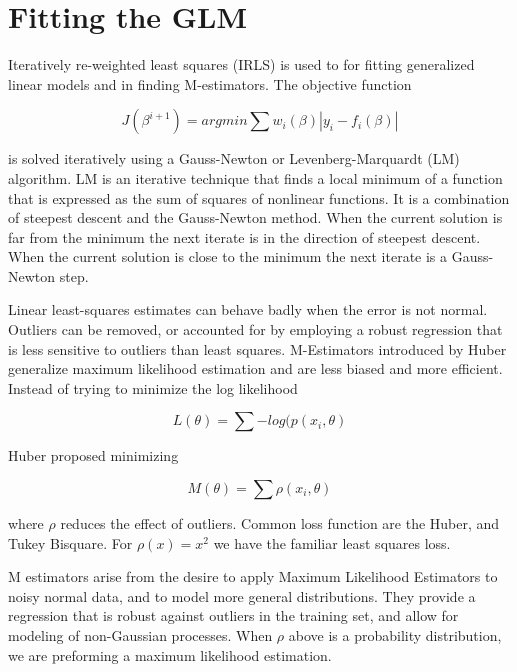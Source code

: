 \section*{Fitting the GLM}Iteratively re-weighted least squares (IRLS) is used to for fitting generalized linear models and in finding M-estimators.  The objective function

\begin{equation}
J(\beta^{i+1}) = arg min \sum w_i ( \beta) | y_i - f_i (\beta) |
\end{equation}

is solved iteratively using a Gauss-Newton or Levenberg-Marquardt (LM) algorithm. LM is an iterative technique that finds a local minimum of a function that is expressed as the sum of squares of nonlinear functions. It is a combination of steepest descent and the Gauss-Newton method. When the current solution is far from the minimum the next iterate is in the direction of steepest descent. When the current solution is close to the minimum the next iterate is a Gauss-Newton step.

Linear least-squares estimates can behave badly when the error is not normal.  Outliers can be removed, or accounted for by employing a robust regression that is less sensitive to outliers than least squares.  M-Estimators introduced by Huber generalize maximum likelihood estimation and are less biased and more efficient.  Instead of trying to minimize the log likelihood

\begin{equation}
L(\theta) = \sum - log ( p(x_i, \theta)
\end{equation}

Huber proposed minimizing

\begin{equation}
M(\theta) = \sum  \rho(x_i, \theta)
\end{equation}

where $\rho$ reduces the effect of outliers. Common loss function are the Huber, and Tukey Bisquare.  For $\rho(x) = x^2$ we have the familiar least squares loss.

M estimators arise from the desire to apply Maximum Likelihood Estimators to noisy normal data, and to model more general distributions. They provide a regression that is robust against outliers in the training set, and allow for modeling of non-Gaussian processes. When $\rho$ above is a probability distribution, we are preforming a maximum likelihood estimation.


